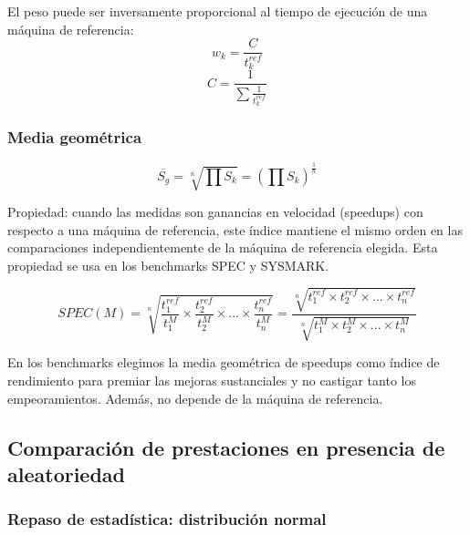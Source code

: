 \documentclass[12pt,spanish]{article}
\begin{document}
El peso puede ser inversamente proporcional al tiempo de ejecución de una máquina de referencia:
\begin{equation*}
	w_k=\frac{C}{t_k^{ref}}
\end{equation*}
\begin{equation*}
	C=\frac{1}{\sum{\frac{1}{t_k^{ref}}}}
\end{equation*}

\subsubsection{Media geométrica}

\begin{equation*}
	\overline{S_g}=\sqrt[n]{\prod{S_k}}=(\prod{S_k})^{\frac{1}{n}}
\end{equation*}

Propiedad: cuando las medidas son ganancias en velocidad (speedups) con respecto a una máquina de referencia, este índice mantiene el mismo orden en las comparaciones independientemente de la máquina de referencia elegida. Esta propiedad se usa en los benchmarks SPEC y SYSMARK.

\begin{equation*}
	SPEC(M)=\sqrt[n]{\frac{t_{1}^{ref}}{t_{1}^{M}} \times \frac{t_{2}^{ref}}{t_{2}^{M}} \times ... \times \frac{t_{n}^{ref}}{t_{n}^{M}}} = \frac{\sqrt[n]{t_{1}^{ref} \times t_{2}^{ref} \times ... \times t_{n}^{ref}}}{\sqrt[n]{t_{1}^{M} \times t_{2}^{M} \times ... \times t_{n}^{M}}}
\end{equation*}

En los benchmarks elegimos la media geométrica de speedups como índice de rendimiento para premiar las mejoras sustanciales y no castigar tanto los empeoramientos. Además, no depende de la máquina de referencia.
\newpage
\subsection{Comparación de prestaciones en presencia de aleatoriedad}

\subsubsection{Repaso de estadística: distribución normal}
\end{document}
